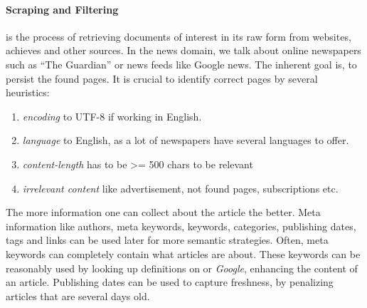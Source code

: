   \paragraph{Scraping and Filtering} is the process of retrieving documents of interest in its raw form from websites, achieves and other sources. In the news domain, we talk about online newspapers such as ``The Guardian'' or news feeds like Google news. The inherent goal is, to persist the found pages. It is crucial to identify correct pages by several heuristics:

  \begin{enumerate}
    \item \emph{encoding} to UTF-8 if working in English.
    \item \emph{language} to English, as a lot of newspapers have several languages to offer.
    \item \emph{content-length} has to be >= 500 chars to be relevant
    \item \emph{irrelevant content} like advertisement, not found pages, subscriptions etc.
  \end{enumerate}

  The more information one can collect about the article the better. Meta information like authors, meta keywords, keywords, categories, publishing dates, tags and links can be used later for more semantic strategies. Often, meta keywords can completely contain what articles are about. These keywords can be reasonably used by looking up definitions on \wiki{} or \emph{Google}, enhancing the content of an article. Publishing dates can be used to capture freshness, by penalizing articles that are several days old.

